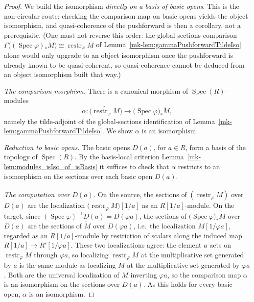 \begin{proof}
  \leanok
  We build the isomorphism \emph{directly on a basis of basic opens}. This is the
  non-circular route: checking the comparison map on basic opens yields the object
  isomorphism, and quasi-coherence of the pushforward is then a corollary, not a
  prerequisite. (One must not reverse this order: the global-sections comparison
  \(\Gamma\bigl((\operatorname{Spec}\varphi)_*\widetilde{M}\bigr) \cong
  \operatorname{restr}_\varphi M\) of
  Lemma~\ref{mk-lem:gammaPushforwardTildeIso} alone would only upgrade to an object
  isomorphism once the pushforward is already known to be quasi-coherent, so
  quasi-coherence cannot be deduced from an object isomorphism built that way.)

  \emph{The comparison morphism.} There is a canonical morphism of
  \(\operatorname{Spec}(R)\)-modules
  \[
    \alpha : \widetilde{\bigl(\operatorname{restr}_\varphi M\bigr)}
    \longrightarrow \bigl(\operatorname{Spec}\varphi\bigr)_*\widetilde{M},
  \]
  namely the tilde-adjoint of the global-sections identification of
  Lemma~\ref{mk-lem:gammaPushforwardTildeIso}. We show \(\alpha\) is an isomorphism.

  \medskip
  \emph{Reduction to basic opens.} The basic opens \(D(a)\), for \(a \in R\), form a
  basis of the topology of \(\operatorname{Spec}(R)\). By the basis-local criterion
  Lemma~\ref{mk-lem:modules_isIso_of_isBasis} it suffices to check that \(\alpha\)
  restricts to an isomorphism on the sections over each basic open \(D(a)\).

  \medskip
  \emph{The computation over \(D(a)\).} On the source, the sections of
  \(\widetilde{(\operatorname{restr}_\varphi M)}\) over \(D(a)\) are the
  localization \(\bigl(\operatorname{restr}_\varphi M\bigr)[1/a]\) as an
  \(R[1/a]\)-module. On the target, since \((\operatorname{Spec}\varphi)^{-1}D(a) =
  D(\varphi a)\), the sections of \(\bigl(\operatorname{Spec}\varphi\bigr)_*
  \widetilde{M}\) over \(D(a)\) are the sections of \(\widetilde{M}\) over
  \(D(\varphi a)\), i.e.\ the localization \(M[1/\varphi a]\), regarded as an
  \(R[1/a]\)-module by restriction of scalars along the induced map
  \(R[1/a] \to R'[1/\varphi a]\). These two localizations agree: the element \(a\)
  acts on \(\operatorname{restr}_\varphi M\) through \(\varphi a\), so localizing
  \(\operatorname{restr}_\varphi M\) at the multiplicative set generated by \(a\) is
  the same module as localizing \(M\) at the multiplicative set generated by
  \(\varphi a\). Both are the universal localization of
  \(M\) inverting \(\varphi a\), so the comparison map \(\alpha\) is an isomorphism
  on the sections over \(D(a)\). As this holds for every basic open, \(\alpha\) is
  an isomorphism.


\end{proof}
